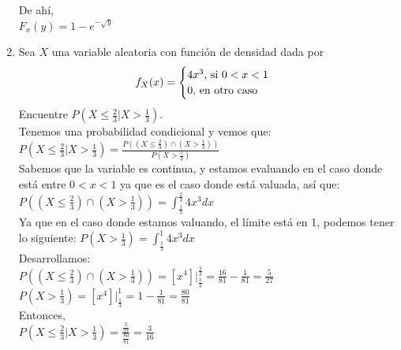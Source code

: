\documentclass[12pt,a4paper]{report}
\begin{document}
\begin{enumerate}
{            De ahí,\\
            $F_{x}(y) =  1 - e^{-\sqrt{y}}$\\
		}

		\item {
			Sea $X$ una variable aleatoria con función de densidad dada por
			\[
				f_X(x) = \begin{cases}
							4x^3, $ si $ 0 < x < 1\\
							0, $ en otro caso$
						 \end{cases}
			\]
			Encuentre $P(X \leq \frac{2}{3}|X > \frac{1}{3})$.\\

			Tenemos una probabilidad condicional y vemos que:\\

			 $P(X \leq \frac{2}{3}|X > \frac{1}{3}) = \frac{P((X \leq \frac{2}{3}) \cap (X > \frac{1}{3}))}{P(X > \frac{1}{3})}$\\

			 Sabemos que la variable es continua, y estamos evaluando en el caso donde está entre $ 0 < x < 1$ ya que es el caso donde está valuada,  así que:\\

			 $P((X \leq \frac{2}{3}) \cap (X > \frac{1}{3})) = \int_{\frac{1}{3}}^{\frac{2}{3}} 4x^3 dx$ \\

			 Ya que en el caso donde estamos valuando, el límite está en 1, podemos tener lo siguiente:
			 $P(X > \frac{1}{3}) = \int_{\frac{1}{3}}^{1} 4x^3 dx$\\

			 Desarrollamos:\\
			 $P((X \leq \frac{2}{3}) \cap (X > \frac{1}{3})) =
			 \left[x^4\right]\Big|_{\frac{1}{3}}^{\frac{2}{3}}=
			 \frac{16}{81} - \frac{1}{81} = \frac{5}{27}$\\

			 $P(X > \frac{1}{3}) =
			 \left[x^4\right]\Big|_{\frac{1}{3}}^{1}=
			 1 - \frac{1}{81} = \frac{80}{81}$\\

			 Entonces,\\
			 $P(X \leq \frac{2}{3}|X > \frac{1}{3})
			 = \frac{\frac{5}{27}}{\frac{80}{81}}
			 = \frac{3}{16}$
		}
	\end{enumerate}
\end{document}
